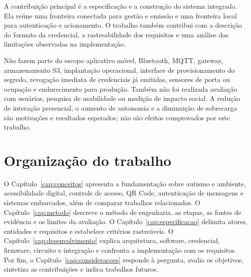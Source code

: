 A contribuição principal é a especificação e a construção do sistema integrado. Ela reúne uma fronteira conectada para gestão e emissão e uma fronteira local para autenticação e acionamento. O trabalho também contribui com a descrição do formato da credencial, a rastreabilidade dos requisitos e uma análise das limitações observadas na implementação.

Não fazem parte do escopo aplicativo móvel, Bluetooth, MQTT, gateway, armazenamento S3, implantação operacional, interface de provisionamento do segredo, revogação imediata de credenciais já emitidas, sensores de porta ou ocupação e endurecimento para produção. Também não foi realizada avaliação com usuários, pesquisa de usabilidade ou medição de impacto social. A redução de interação presencial, o aumento de autonomia e a diminuição de sobrecarga são motivações e resultados esperados; não são efeitos comprovados por este trabalho.

\section{Organização do trabalho}

O Capítulo~\ref{cap:conceitos} apresenta a fundamentação sobre autismo e ambiente, acessibilidade digital, controle de acesso, QR Code, autenticação de mensagens e sistemas embarcados, além de comparar trabalhos relacionados. O Capítulo~\ref{cap:metodo} descreve o método de engenharia, as etapas, as fontes de evidência e os limites da avaliação. O Capítulo~\ref{cap:especificacao} delimita atores, entidades e requisitos e estabelece critérios rastreáveis. O Capítulo~\ref{cap:desenvolvimento} explica arquitetura, software, credencial, firmware, circuito e integração e confronta a implementação com os requisitos. Por fim, o Capítulo~\ref{cap:consideracoes} responde à pergunta, avalia os objetivos, sintetiza as contribuições e indica trabalhos futuros.
